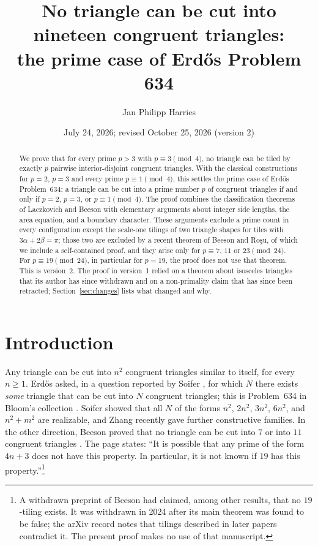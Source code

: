 \documentclass[11pt]{amsart}
\title[The prime case of Erd\H{o}s Problem 634]{No triangle can be cut into nineteen congruent triangles:\\ the prime case of Erd\H{o}s Problem 634}
\author{Jan Philipp Harries}
\date{July 24, 2026; revised October 25, 2026 (version 2)}
\theoremstyle{remark}
\begin{document}
\begin{abstract}
We prove that for every prime $p>3$ with $p\equiv 3 \pmod 4$, no triangle can be tiled by exactly $p$ pairwise interior-disjoint congruent triangles. With the classical constructions for $p=2$, $p=3$ and every prime $p\equiv 1\pmod 4$, this settles the prime case of Erd\H{o}s Problem~634: a triangle can be cut into a prime number $p$ of congruent triangles if and only if $p=2$, $p=3$, or $p\equiv 1\pmod 4$. The proof combines the classification theorems of Laczkovich and Beeson with elementary arguments about integer side lengths, the area equation, and a boundary character. These arguments exclude a prime count in every configuration except the scale-one tilings of two triangle shapes for tiles with $3\alpha+2\beta=\pi$; those two are excluded by a recent theorem of Beeson and Ro\c{s}u, of which we include a self-contained proof, and they arise only for $p\equiv 7$, $11$ or $23\pmod{24}$. For $p\equiv 19\pmod{24}$, in particular for $p=19$, the proof does not use that theorem. This is version~2. The proof in version~1 relied on a theorem about isosceles triangles that its author has since withdrawn and on a non-primality claim that has since been retracted; Section~\ref{sec:changes} lists what changed and why.
\end{abstract}

\maketitle

\section{Introduction}

Any triangle can be cut into $n^2$ congruent triangles similar to itself, for every $n\ge 1$. Erd\H{o}s asked, in a question reported by Soifer \cite{Soifer09}, for which $N$ there exists \emph{some} triangle that can be cut into $N$ congruent triangles; this is Problem~634 in Bloom's collection \cite{EP634}. Soifer showed that all $N$ of the forms $n^2$, $2n^2$, $3n^2$, $6n^2$, and $n^2+m^2$ are realizable, and Zhang \cite{Zhang25} recently gave further constructive families. In the other direction, Beeson proved that no triangle can be cut into $7$ or into $11$ congruent triangles \cite{Beeson7}. The page \cite{EP634} states: ``It is possible that any prime of the form $4n+3$ does not have this property. In particular, it is not known if $19$ has this property.''\footnote{A withdrawn preprint of Beeson \cite{Beeson2228} had claimed, among other results, that no $19$-tiling exists. It was withdrawn in 2024 after its main theorem was found to be false; the arXiv record notes that tilings described in later papers contradict it. The present proof makes no use of that manuscript.}
\end{document}
